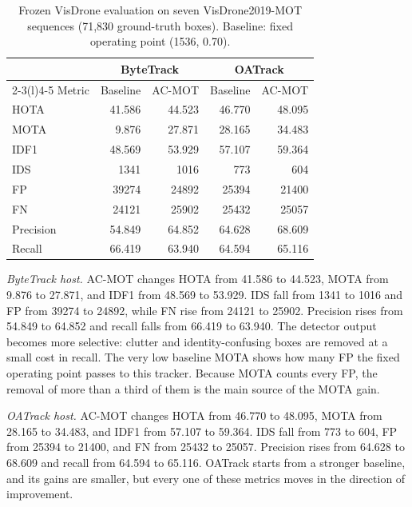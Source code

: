 \documentclass[pdflatex,sn-mathphys-num,iicol]{sn-jnl}
\begin{document}
\begin{table}[t]
\caption{Frozen VisDrone evaluation on seven VisDrone2019-MOT sequences
(71,830 ground-truth boxes). Baseline: fixed operating point (1536, 0.70).}
\label{tab:visdrone}
\centering\footnotesize
\setlength{\tabcolsep}{4pt}
\begin{tabular}{@{}lrrrr@{}}
\toprule
 & \multicolumn{2}{c}{ByteTrack} & \multicolumn{2}{c}{OATrack}\\
\cmidrule(lr){2-3}\cmidrule(l){4-5}
Metric & Baseline & AC-MOT & Baseline & AC-MOT\\
\midrule
HOTA & 41.586 & 44.523 & 46.770 & 48.095\\
MOTA & 9.876 & 27.871 & 28.165 & 34.483\\
IDF1 & 48.569 & 53.929 & 57.107 & 59.364\\
IDS & 1341 & 1016 & 773 & 604\\
FP & 39274 & 24892 & 25394 & 21400\\
FN & 24121 & 25902 & 25432 & 25057\\
Precision & 54.849 & 64.852 & 64.628 & 68.609\\
Recall & 66.419 & 63.940 & 64.594 & 65.116\\
\bottomrule
\end{tabular}
\end{table}

\emph{ByteTrack host.} AC-MOT changes HOTA from 41.586 to 44.523, MOTA from
9.876 to 27.871, and IDF1 from 48.569 to 53.929. IDS fall from 1341 to 1016
and FP from 39274 to 24892, while FN rise from 24121 to 25902. Precision rises
from 54.849 to 64.852 and recall falls from 66.419 to 63.940. The detector
output becomes more selective: clutter and identity-confusing boxes are
removed at a small cost in recall. The very low baseline MOTA shows how many
FP the fixed operating point passes to this tracker. Because
MOTA counts every FP, the removal of more than a third of them is
the main source of the MOTA gain.

\emph{OATrack host.} AC-MOT changes HOTA from 46.770 to 48.095, MOTA from
28.165 to 34.483, and IDF1 from 57.107 to 59.364. IDS fall from 773 to 604, FP
from 25394 to 21400, and FN from 25432 to 25057. Precision rises from 64.628 to
68.609 and recall from 64.594 to 65.116. OATrack starts from a stronger
baseline, and its gains are smaller, but every one of these metrics moves in
the direction of improvement.
\end{document}
